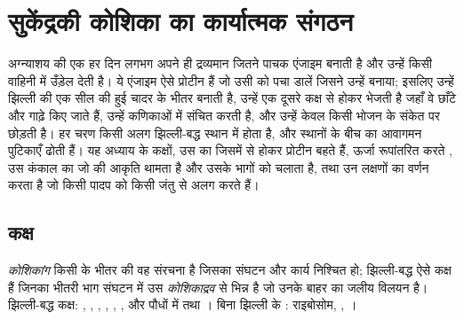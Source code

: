 \chapter{सुकेंद्रकी कोशिका का कार्यात्मक संगठन}\label{ch:b1:eukaryotic-cell}

अग्न्याशय की एक  हर दिन लगभग अपने ही द्रव्यमान जितने पाचक एंजाइम
बनाती है और उन्हें किसी वाहिनी में उँड़ेल देती है। ये एंजाइम ऐसे प्रोटीन
हैं जो उसी  को पचा डालें जिसने उन्हें बनाया; इसलिए  उन्हें
झिल्ली की एक सील की हुई चादर के भीतर बनाती है, उन्हें एक दूसरे कक्ष से
होकर भेजती है जहाँ वे छाँटे और गाढ़े किए जाते हैं, उन्हें कणिकाओं में
संचित करती है, और उन्हें केवल किसी भोजन के संकेत पर छोड़ती है। हर चरण
किसी अलग झिल्ली-बद्ध स्थान में होता है, और स्थानों के बीच का आवागमन
पुटिकाएँ ढोती हैं। यह अध्याय  के कक्षों, उस  का जिसमें से होकर प्रोटीन बहते हैं, ऊर्जा रूपांतरित करते
, उस कंकाल का जो  की आकृति थामता है और उसके भागों को
चलाता है, तथा उन लक्षणों का वर्णन करता है जो किसी पादप  को किसी
जंतु  से अलग करते हैं।

\section{कक्ष}

\begin{definition}[कोशिकांग, कोशिकाद्रव]\label{def:b1:eukaryotic-cell:organelle}
\emph{कोशिकांग} किसी  के भीतर की वह संरचना है
जिसका संघटन और कार्य निश्चित हो; झिल्ली-बद्ध  ऐसे कक्ष हैं
जिनका भीतरी भाग संघटन में उस \emph{कोशिकाद्रव} से
भिन्न है जो उनके बाहर  का जलीय विलयन है। झिल्ली-बद्ध कक्ष:
, , , , ,
, और पौधों में  तथा । बिना झिल्ली के :
राइबोसोम, , ।
\end{definition}

